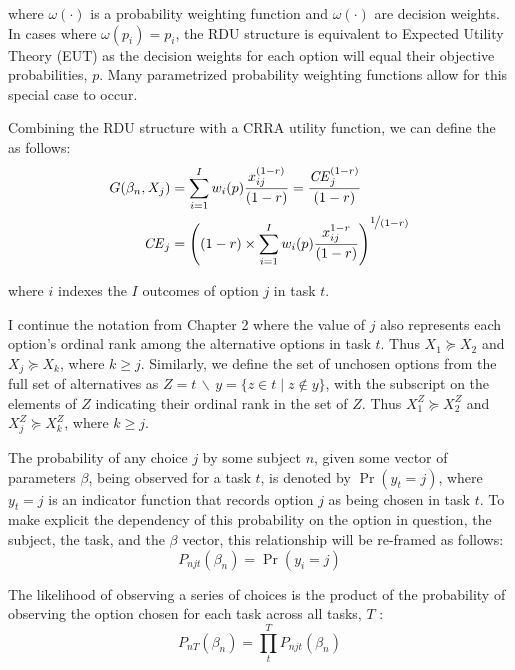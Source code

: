 \documentclass[../main.tex]{subfiles}
\begin{document}
\noindent where $\omega(\cdot)$ is a probability weighting function and $\omega(\cdot)$ are decision weights.
In cases where $\omega(p_i) = p_i$, the RDU structure is equivalent to Expected Utility Theory (EUT) as the decision weights for each option will equal their objective probabilities, $p$.
Many parametrized probability weighting functions allow for this special case to occur.

Combining the RDU structure with a CRRA utility function, we can define the {\CE} as follows:
\begin{align}
	\label{eq3:CEcalc}
	\begin{split}
		G(\beta_n,X_j) &= \sum_{i=1}^{I} w_i(p) \frac{x_{ij}^{(1-r)}}{(1-r)} = \frac{ {\mathit{CE}}_j^{(1-r)}}{(1-r)}\\
		{\mathit{CE}}_j &=  \left( (1-r) \times \sum_{i=1}^{I} w_i(p) \frac{x_{ij}^{1-r}}{(1-r)} \right)^{ \displaystyle\nicefrac{1}{(1-r)} }
	\end{split}
\end{align}

\noindent where $i$ indexes the $I$ outcomes of option $j$ in task $t$. 


I continue the notation from Chapter 2 where the value of $j$ also represents each option's ordinal rank among the alternative options in task $t$.
Thus $X_1 \succcurlyeq X_2$ and $X_j \succcurlyeq X_k$, where $k \geq j$.
Similarly, we define the set of unchosen options from the full set of alternatives as $Z = t \,\backslash\, y = \{z \in t \;|\; z \notin y \}$, with the subscript on the elements of $Z$ indicating their ordinal rank in the set of $Z$.
Thus $X_1^Z \succcurlyeq X_2^Z$ and $X_j^Z \succcurlyeq X_k^Z$, where $k \geq j$.

The probability of any choice $j$ by some subject $n$, given some vector of parameters $\beta$, being observed for a task $t$, is denoted by $\Pr( y_t = j)$, where $y_t = j$ is an indicator function that records option $j$ as being chosen in task $t$.
To make explicit the dependency of this probability on the option in question, the subject, the task, and the $\beta$ vector, this relationship will be re-framed as follows:
\begin{equation}
	\label{eq3:Pnjt}
	P_{njt}(\beta_n) = \Pr(y_i = j)
\end{equation}

The likelihood of observing a series of choices is the product of the probability of observing the option chosen for each task across all tasks, $T$ :
\begin{equation}
	\label{eq3:PnT}
	P_{nT}(\beta_n) =  \prod_{t}^{T} P_{njt}(\beta_n)
\end{equation}
\end{document}

